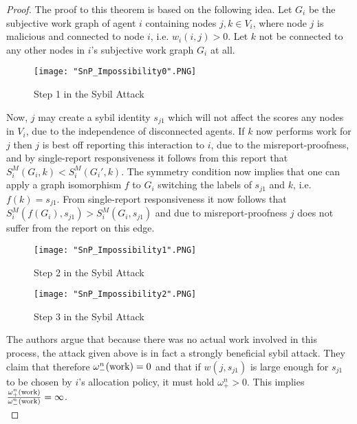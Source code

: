 \begin{proof}
\noindent{}The proof to this theorem is based on the following idea. Let $G_i$ be the subjective work graph of agent $i$ containing nodes $j,k\in{}V_i$, where node $j$ is malicious and connected to node $i$, i.e. $w_i(i,j)>0$. Let $k$ not be connected to any other nodes in $i$'s subjective work graph $G_i$ at all. \vspace{1em}\\


\begin{figure}[H]
\begin{center}
\texttt{[image: "SnP\_Impossibility0".PNG]}
\label{fig:SnP_Impossibility0}
\caption{Step 1 in the Sybil Attack}
\end{center}
\end{figure}

\noindent{}Now, $j$ may create a sybil identity $s_{j1}$ which will not affect the scores any nodes in $V_i$, due to the independence of disconnected agents. If $k$ now performs work for $j$ then $j$ is best off reporting this interaction to $i$, due to the misreport-proofness, and by single-report responsiveness it follows from this report that $S^M_i(G_i,k) < S^M_i(G_i',k)$. The symmetry condition now implies that one can apply a graph isomorphism $f$ to $G_i$ switching the labels of $s_{j1}$ and $k$, i.e. $f(k)=s_{j1}$. From single-report responsiveness it now follows that $S^M_i(f(G_i),s_{j1}) > S^M_i(G_i,s_{j1})$ and due to misreport-proofness $j$ does not suffer from the report on this edge.\vspace{1em}\\


\begin{figure}[H]
\begin{center}
\texttt{[image: "SnP\_Impossibility1".PNG]}
\label{fig:SnP_Impossibility1}
\caption{Step 2 in the Sybil Attack}
\end{center}
\end{figure}


\begin{figure}[H]
\begin{center}
\texttt{[image: "SnP\_Impossibility2".PNG]}
\label{fig:SnP_Impossibility2}
\caption{Step 3 in the Sybil Attack}
\end{center}
\end{figure}

\noindent{}The authors argue that because there was no actual work involved in this process, the attack given above is in fact a strongly beneficial sybil attack. They claim that therefore $\omega^n_{-}({\rm work})=0$ and that if $w(j,s_{j1})$ is large enough for $s_{j1}$ to be chosen by $i$'s allocation policy, it must hold $\omega^n_{+}>0$. This implies $\frac{\omega^n_{+}({\rm work})}{\omega^n_{-}({\rm work})}=\infty$. \vspace{1em}\\
\end{proof}

